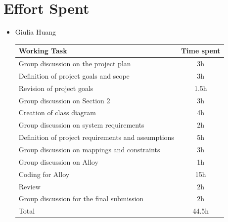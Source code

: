 \documentclass[12pt]{article}
\begin{document}
\section{Effort Spent}
\begin{itemize}
    \item Giulia Huang {
    \begin{center}
\begin{tabular}{| l | c |}
\hline
Working Task & Time spent \\
\hline
Group discussion on the project plan & 3h  \\
\hline
Definition of project goals and scope & 3h  \\
\hline
Revision of project goals & 1.5h  \\
\hline
Group discussion on Section 2 & 3h  \\
\hline
Creation of class diagram & 4h \\
\hline
Group discussion on system requirements & 2h \\
\hline
Definition of project requirements and assumptions & 5h \\
\hline
Group discussion on mappings and constraints & 3h \\
\hline
Group discussion on Alloy & 1h \\
\hline
Coding for Alloy & 15h \\
\hline
Review & 2h \\
\hline
Group discussion for the final submission & 2h \\
\hline
Total & 44.5h \\
\hline
\end{tabular}
\end{center}
    }
    

\end{itemize}
\end{document}
